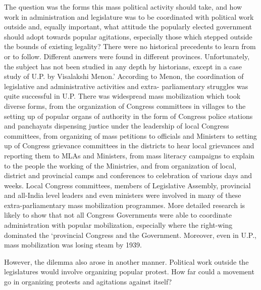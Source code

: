 \begin{multicols}{2}
The question was the forms this mass political activity should take, and how work in administration and legislature was to be coordinated with political work outside and, equally important, what attitude the popularly elected government should adopt towards popular agitations, especially those which stepped outside the bounds of existing legality? There were no historical precedents to learn from or to follow. Different answers were found in different provinces. Unfortunately, the subject has not been studied in any depth by historians, except in a case study of U.P. by Visalakshi Menon.' According to Menon, the coordination of legislative and administrative activities and extra- parliamentary struggles was quite successful in U.P. There was widespread mass mobilization which took diverse forms, from the organization of Congress committees in villages to the setting up of popular organs of authority in the form of Congress police stations and panchayats dispensing justice under the leadership of local Congress committees, from organizing of mass petitions to officials and Ministers to setting up of Congress grievance committees in the districts to hear local grievances and reporting them to MLAs and Ministers, from mass literacy campaigns to explain to the people the working of the Ministries, and from organization of local, district and provincial camps and conferences to celebration of various days and weeks. Local Congress committees, members of Legislative Assembly, provincial and all-India level leaders and even ministers were involved in many of these extra-parliamentary mass mobilization programmes. More detailed research is likely to show that not all Congress Governments were able to coordinate administration with popular mobilization, especially where the right-wing dominated the `provincial Congress and the Government. Moreover, even in U.P., mass mobilization was losing steam by 1939. 

However, the dilemma also arose in another manner. Political work outside the legislatures would involve organizing popular protest. How far could a movement go in organizing protests and agitations against itself? 


\end{multicols}
